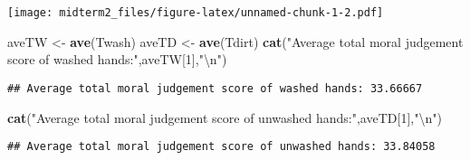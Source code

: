 \documentclass[]{article}
\newenvironment{Shaded}{\begin{snugshade}}{\end{snugshade}}
\newcommand{\CharTok}[1]{\textcolor[rgb]{0.31,0.60,0.02}{#1}}
\newcommand{\DecValTok}[1]{\textcolor[rgb]{0.00,0.00,0.81}{#1}}
\newcommand{\KeywordTok}[1]{\textcolor[rgb]{0.13,0.29,0.53}{\textbf{#1}}}
\newcommand{\NormalTok}[1]{#1}
\newcommand{\StringTok}[1]{\textcolor[rgb]{0.31,0.60,0.02}{#1}}
\begin{document}
\texttt{[image: midterm2\_files/figure-latex/unnamed-chunk-1-2.pdf]}

\begin{Shaded}
\begin{Highlighting}[]
\NormalTok{aveTW <-}\StringTok{ }\KeywordTok{ave}\NormalTok{(Twash)}
\NormalTok{aveTD <-}\StringTok{ }\KeywordTok{ave}\NormalTok{(Tdirt)}
\KeywordTok{cat}\NormalTok{(}\StringTok{"Average total moral judgement score of washed hands:"}\NormalTok{,aveTW[}\DecValTok{1}\NormalTok{],}\StringTok{"}\CharTok{\textbackslash{}n}\StringTok{"}\NormalTok{)}
\end{Highlighting}
\end{Shaded}

\begin{verbatim}
## Average total moral judgement score of washed hands: 33.66667
\end{verbatim}

\begin{Shaded}
\begin{Highlighting}[]
\KeywordTok{cat}\NormalTok{(}\StringTok{"Average total moral judgement score of unwashed hands:"}\NormalTok{,aveTD[}\DecValTok{1}\NormalTok{],}\StringTok{"}\CharTok{\textbackslash{}n}\StringTok{"}\NormalTok{)}
\end{Highlighting}
\end{Shaded}

\begin{verbatim}
## Average total moral judgement score of unwashed hands: 33.84058
\end{verbatim}
\end{document}
